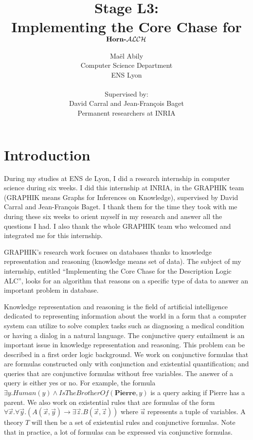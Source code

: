 \documentclass{article}
\title{Stage L3: \\ Implementing the Core Chase for $\textbf{Horn-$\mathcal{ALCH}$}$}
\author{Maël Abily \\ Computer Science Department \\ ENS Lyon \\ \\ Supervised by: \\ David Carral and Jean-François Baget \\ Permanent researchers at INRIA}
\theoremstyle{definition}
\theoremstyle{remark}
\begin{document}
\maketitle						%



\newpage

\tableofcontents

\section{Introduction}

During my studies at ENS de Lyon, I did a research internship in computer science during six weeks. I did this internship at INRIA, in the GRAPHIK team (GRAPHIK means Graphs for Inferences on Knowledge), supervised by David Carral and Jean-François Baget. I thank them for the time they took with me during these six weeks to orient myself in my research and answer all the
questions I had. I also thank the whole GRAPHIK team who welcomed and integrated me for this internship. 

GRAPHIK's research work focuses on databases thanks to knowledge representation and reasoning (knowledge means set of data). The subject of my internship, entitled ``Implementing the Core Chase for the Description Logic ALC'', looks for an algorithm that reasons on a specific type of data to answer an important problem in database. 


Knowledge representation and reasoning is the field of artificial intelligence dedicated to representing information about the world in a form that a computer system can utilize to solve complex tasks such as diagnosing a medical condition or having a dialog in a natural language.  The conjunctive query entailment is an important issue in knowledge representation and reasoning. This problem can be described in a first order logic background. We work on conjunctive formulas that are formulas constructed only with conjunction and existential quantification; and queries that are conjunctive formulas without free variables. The answer of a query is either yes or no. For example, the formula $ \exists y. \textit{Human}(y) \wedge \textit{IsTheBrotherOf}(\textbf{Pierre},y)$ is a query asking
if Pierre has a parent. We also work on existential rules that are formulas of the form $\forall \vec x.\forall \vec y.( A(\vec x,\vec y) \rightarrow \exists \vec z. B(\vec x,\vec z))$ where $\vec u$ represents a tuple of variables. A theory $T$ will then be a set of existential rules and conjunctive formulas. Note that in practice, a lot of formulas can be expressed via conjunctive formulas.
\end{document}

